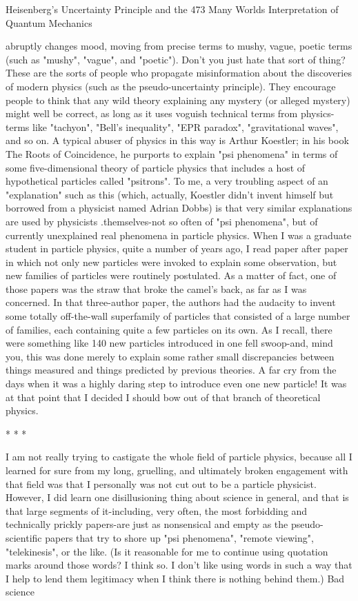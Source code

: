 Heisenberg's Uncertainty Principle and the                                           473
Many Worlds Interpretation of Quantum Mechanics

abruptly changes mood, moving from precise terms to mushy, vague, poetic terms
(such as "mushy", "vague", and "poetic"). Don't you just hate that sort of thing?
        These are the sorts of people who propagate misinformation about the
discoveries of modern physics (such as the pseudo-uncertainty principle). They
encourage people to think that any wild theory explaining any mystery (or alleged
mystery) might well be correct, as long as it uses voguish technical terms from
physics-terms like "tachyon", "Bell's inequality", "EPR paradox", "gravitational
waves", and so on. A typical abuser of physics in this way is Arthur Koestler; in his
book The Roots of Coincidence, he purports to explain "psi phenomena" in terms of
some five-dimensional theory of particle physics that includes a host of hypothetical
particles called "psitrons".
        To me, a very troubling aspect of an "explanation" such as this (which,
actually, Koestler didn't invent himself but borrowed from a physicist named Adrian
Dobbs) is that very similar explanations are used by physicists .themselves-not so
often of "psi phenomena", but of currently unexplained real phenomena in particle
physics. When I was a graduate student in particle physics, quite a number of years
ago, I read paper after paper in which not only new particles were invoked to explain
some observation, but new families of particles were routinely postulated. As a matter
of fact, one of those papers was the straw that broke the camel's back, as far as I was
concerned. In that three-author paper, the authors had the audacity to invent some
totally off-the-wall superfamily of particles that consisted of a large number of
families, each containing quite a few particles on its own. As I recall, there were
something like 140 new particles introduced in one fell swoop-and, mind you, this
was done merely to explain some rather small discrepancies between things measured
and things predicted by previous theories. A far cry from the days when it was a
highly daring step to introduce even one new particle! It was at that point that I
decided I should bow out of that branch of theoretical physics.

                                       *   *   *

         I am not really trying to castigate the whole field of particle physics, because
all I learned for sure from my long, gruelling, and ultimately broken engagement with
that field was that I personally was not cut out to be a particle physicist. However, I
did learn one disillusioning thing about science in general, and that is that large
segments of it-including, very often, the most forbidding and technically prickly
papers-are just as nonsensical and empty as the pseudo-scientific papers that try to
shore up "psi phenomena", "remote viewing", "telekinesis", or the like. (Is it
reasonable for me to continue using quotation marks around those words? I think so. I
don't like using words in such a way that I help to lend them legitimacy when I think
there is nothing behind them.) Bad science




